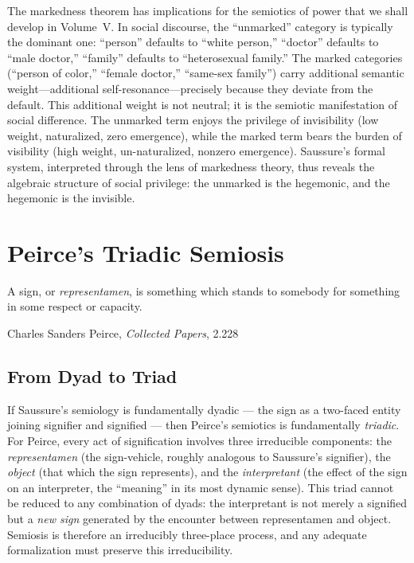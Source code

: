 \begin{remark}
The markedness theorem has implications for the semiotics of power that we shall develop in Volume~V. In social discourse, the ``unmarked'' category is typically the dominant one: ``person'' defaults to ``white person,'' ``doctor'' defaults to ``male doctor,'' ``family'' defaults to ``heterosexual family.'' The marked categories (``person of color,'' ``female doctor,'' ``same-sex family'') carry additional semantic weight---additional self-resonance---precisely because they deviate from the default. This additional weight is not neutral; it is the semiotic manifestation of social difference. The unmarked term enjoys the privilege of invisibility (low weight, naturalized, zero emergence), while the marked term bears the burden of visibility (high weight, un-naturalized, nonzero emergence). Saussure's formal system, interpreted through the lens of markedness theory, thus reveals the algebraic structure of social privilege: the unmarked is the hegemonic, and the hegemonic is the invisible.
\end{remark}



\chapter{Peirce's Triadic Semiosis}
\label{ch:peirce}

\epigraph{A sign, or \textit{representamen}, is something which stands to somebody for something in some respect or capacity.}{Charles Sanders Peirce, \textit{Collected Papers}, 2.228}

\section{From Dyad to Triad}

If Saussure's semiology is fundamentally dyadic --- the sign as a
two-faced entity joining signifier and signified --- then Peirce's
semiotics is fundamentally \emph{triadic}. For Peirce, every act of
signification involves three irreducible components: the
\emph{representamen} (the sign-vehicle, roughly analogous to
Saussure's signifier), the \emph{object} (that which the sign
represents), and the \emph{interpretant} (the effect of the sign on
an interpreter, the ``meaning'' in its most dynamic sense). This triad
cannot be reduced to any combination of dyads: the interpretant is
not merely a signified but a \emph{new sign} generated by the encounter
between representamen and object. Semiosis is therefore an irreducibly
three-place process, and any adequate formalization must preserve this
irreducibility.

